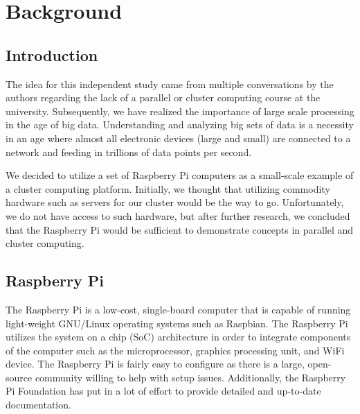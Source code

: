 
\chapter{Background} %

\label{Chapter1} %


\newcommand{\keyword}[1]{\textbf{#1}}
\newcommand{\tabhead}[1]{\textbf{#1}}
\newcommand{\code}[1]{\texttt{#1}}
\newcommand{\file}[1]{\texttt{\bfseries#1}}
\newcommand{\option}[1]{\texttt{\itshape#1}}


\section{Introduction}
	The idea for this independent study came from multiple conversations by the authors regarding the lack of a parallel or cluster computing course at the university. Subsequently, we have realized the importance of large scale processing in the age of big data. Understanding and analyzing big sets of data is a necessity in an age where almost all electronic devices (large and small) are connected to a network and feeding in trillions of data points per second. 
	
	We decided to utilize a set of Raspberry Pi computers as a small-scale example of a cluster computing platform. Initially, we thought that utilizing commodity hardware such as servers for our cluster would be the way to go. Unfortunately, we do not have access to such hardware, but after further research, we concluded that the Raspberry Pi would be sufficient to demonstrate concepts in parallel and cluster computing. 
	


\section{Raspberry Pi }

	The Raspberry Pi is a low-cost, single-board computer that is capable of running light-weight GNU/Linux operating systems such as Raspbian. The Raspberry Pi utilizes the system on a chip (SoC) architecture in order to integrate components of the computer such as the microprocessor, graphics processing unit, and WiFi device. The Raspberry Pi is fairly easy to configure as there is a large, open-source community willing to help with setup issues. Additionally, the Raspberry Pi Foundation has put in a lot of effort to provide detailed and up-to-date documentation.

